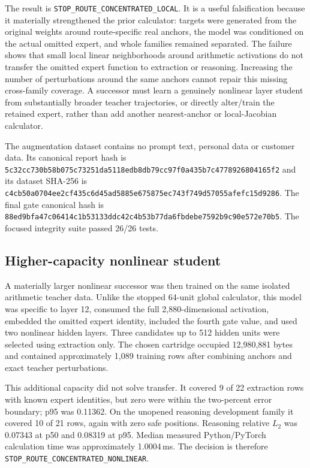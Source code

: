 The result is \texttt{STOP\_ROUTE\_CONCENTRATED\_LOCAL}.  It is a useful
falsification because it materially strengthened the prior calculator: targets
were generated from the original weights around route-specific real anchors,
the model was conditioned on the actual omitted expert, and whole families
remained separated.  The failure shows that small local linear neighborhoods
around arithmetic activations do not transfer the omitted expert function to
extraction or reasoning.  Increasing the number of perturbations around the
same anchors cannot repair this missing cross-family coverage.  A successor
must learn a genuinely nonlinear layer student from substantially broader
teacher trajectories, or directly alter/train the retained expert, rather than
add another nearest-anchor or local-Jacobian calculator.

The augmentation dataset contains no prompt text, personal data or customer
data.  Its canonical report hash is
\texttt{5c32cc730b58b075c73251da5118edb8db79cc97f0a435b7c4778926804165f2}
and its dataset SHA-256 is
\texttt{c4cb50a0704ee2cf435c6d45ad5885e675875ec743f749d57055afefc15d9286}.
The final gate canonical hash is
\texttt{88ed9bfa47c06414c1b53133ddc42c4b53b77da6fbdebe7592b9c90e572e70b5}.
The focused integrity suite passed 26/26 tests.

\subsection{Higher-capacity nonlinear student}

A materially larger nonlinear successor was then trained on the same isolated
arithmetic teacher data.  Unlike the stopped 64-unit global calculator, this
model was specific to layer 12, consumed the full 2,880-dimensional activation,
embedded the omitted expert identity, included the fourth gate value, and used
two nonlinear hidden layers.  Three candidates up to 512 hidden units were
selected using extraction only.  The chosen cartridge occupied 12,980,881
bytes and contained approximately 1,089 training rows after combining anchors
and exact teacher perturbations.

This additional capacity did not solve transfer.  It covered 9 of 22 extraction
rows with known expert identities, but zero were within the two-percent error
boundary; p95 was 0.11362.  On the unopened reasoning development family it
covered 10 of 21 rows, again with zero safe positions.  Reasoning relative
$L_2$ was 0.07343 at p50 and 0.08319 at p95.  Median measured Python/PyTorch
calculation time was approximately 1.0004\,ms.  The decision is therefore
\texttt{STOP\_ROUTE\_CONCENTRATED\_NONLINEAR}.

